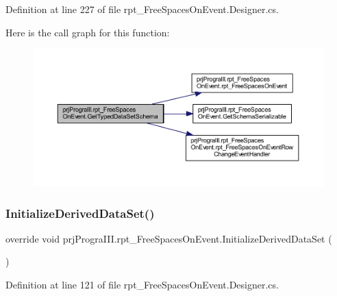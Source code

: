 Definition at line 227 of file rpt\+\_\+\+Free\+Spaces\+On\+Event.\+Designer.\+cs.

Here is the call graph for this function\+:
\nopagebreak
\begin{figure}[H]
\begin{center}
\leavevmode
\includegraphics[width=350pt]{classprj_progra_i_i_i_1_1rpt___free_spaces_on_event_a154035cd1f8b30ec221c366ebf50d75b_cgraph}
\end{center}
\end{figure}
\hypertarget{classprj_progra_i_i_i_1_1rpt___free_spaces_on_event_a038f97041ca0fe3bdb95e2757c8ad74e}{}\label{classprj_progra_i_i_i_1_1rpt___free_spaces_on_event_a038f97041ca0fe3bdb95e2757c8ad74e} 
\subsubsection{\texorpdfstring{Initialize\+Derived\+Data\+Set()}{InitializeDerivedDataSet()}}
{\footnotesize\ttfamily override void prj\+Progra\+I\+I\+I.\+rpt\+\_\+\+Free\+Spaces\+On\+Event.\+Initialize\+Derived\+Data\+Set (\begin{DoxyParamCaption}{ }\end{DoxyParamCaption})\hspace{0.3cm}{\ttfamily [protected]}}



Definition at line 121 of file rpt\+\_\+\+Free\+Spaces\+On\+Event.\+Designer.\+cs.

\hypertarget{classprj_progra_i_i_i_1_1rpt___free_spaces_on_event_aae8b21abc3604c87d10fab9ad31a780f}{}\label{classprj_progra_i_i_i_1_1rpt___free_spaces_on_event_aae8b21abc3604c87d10fab9ad31a780f} 
